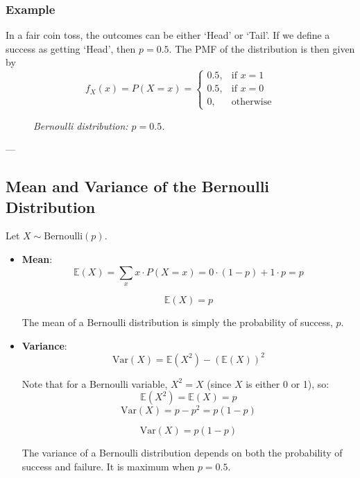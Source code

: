 \documentclass[twoside]{book}
\begin{document}
\subsubsection{Example}

In a fair coin toss, the outcomes can be either `Head' or `Tail'. If we define a success as getting `Head', then $p = 0.5$. The PMF of the distribution is then given by
\[
f_X(x) = P(X = x) =
\begin{cases}
0.5, & \text{if } x = 1 \\
0.5, & \text{if } x = 0 \\
0, & \text{otherwise}
\end{cases}
\]

\begin{figure}[H]
\begin{center}
\end{center}
\caption{\textit{Bernoulli distribution: $p = 0.5$.}}
\end{figure}

---

\subsection{Mean and Variance of the Bernoulli Distribution}

Let $X \sim \text{Bernoulli}(p)$.
\begin{itemize}
    \item \textbf{Mean}:
\[
\mathbb{E}(X) = \sum_{x} x \cdot P(X = x) = 0 \cdot (1 - p) + 1 \cdot p = p
\]
\begin{textbox}
    \[
\mathbb{E}(X) = p
\]
\end{textbox}

The mean of a Bernoulli distribution is simply the probability of success, $p$.


\item \textbf{Variance}:
\[
\text{Var}(X) = \mathbb{E}(X^2) - (\mathbb{E}(X))^2
\]

Note that for a Bernoulli variable, $X^2 = X$ (since $X$ is either 0 or 1), so:
\[
\mathbb{E}(X^2) = \mathbb{E}(X) = p
\]
\[
\text{Var}(X) = p - p^2 = p(1 - p)
\]
\begin{textbox}
    \[
\text{Var}(X) = p(1 - p)
\]
\end{textbox}

The variance of a Bernoulli distribution depends on both the probability of success and failure. It is maximum when $p = 0.5$.
\end{itemize}
\end{document}
